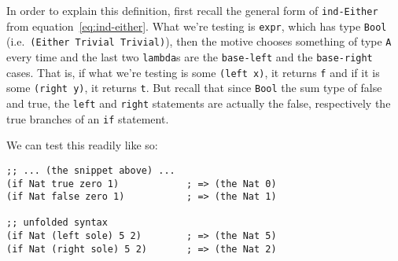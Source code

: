 In order to explain this definition, first recall the general form
of \texttt{ind-Either} from equation~\eqref{eq:ind-either}. What we're testing
is \texttt{expr}, which has type \texttt{Bool} (i.e.\ \texttt{(Either Trivial Trivial)}),
then the motive chooses something of type \texttt{A} every time and the last
two \texttt{lambda}s are the \texttt{base-left} and the \texttt{base-right} cases.
That is, if what we're testing is some \texttt{(left x)}, it returns \texttt{f}
and if it is some \texttt{(right y)}, it returns \texttt{t}. But recall that
since \texttt{Bool} the sum type of false and true, the \texttt{left} and
\texttt{right} statements are actually the false, respectively the true branches
of an \texttt{if} statement.

We can test this readily like so:
{
  \small
\begin{verbatim}
;; ... (the snippet above) ...
(if Nat true zero 1)            ; => (the Nat 0)
(if Nat false zero 1)           ; => (the Nat 1)

;; unfolded syntax
(if Nat (left sole) 5 2)        ; => (the Nat 5)
(if Nat (right sole) 5 2)       ; => (the Nat 2)
\end{verbatim}
}


